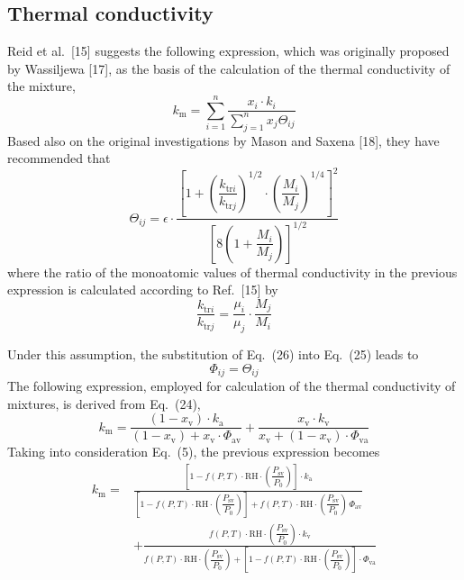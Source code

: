 \documentclass[11pt]{article}
\newcommand{\Psv}{P_\mathrm{sv}}
\newcommand{\RH}{\mathrm{RH}}
\newcommand{\fPT}{f(P,T)}
\newcommand{\grp}{\fPT\cdot\RH\cdot\left(\dfrac{\Psv}{P_0}\right)}
\begin{document}
\subsection{Thermal conductivity}

Reid et al.\ [15] suggests the following expression, which was
originally proposed by Wassiljewa [17], as the basis of the
calculation of the thermal conductivity of the mixture,
\begin{equation}
k_\mathrm{m} = \sum_{i=1}^{n}
  \frac{x_i\cdot k_i}{\sum_{j=1}^{n} x_j \Theta_{ij}}
\end{equation}
Based also on the original investigations by Mason and Saxena [18],
they have recommended that
\begin{equation}
\Theta_{ij} = \epsilon\cdot\frac{\left[1
  + \left(\dfrac{k_{\mathrm{tr}i}}{k_{\mathrm{tr}j}}\right)^{1/2}
  \cdot\left(\dfrac{M_i}{M_j}\right)^{1/4}\right]^{2}}
  {\left[8\left(1+\dfrac{M_i}{M_j}\right)\right]^{1/2}}
\end{equation}
where the ratio of the monoatomic values of thermal conductivity in the
previous expression is calculated according to Ref.~[15] by
\begin{equation}
\frac{k_{\mathrm{tr}i}}{k_{\mathrm{tr}j}}
 = \frac{\mu_i}{\mu_j}\cdot\frac{M_j}{M_i}
\end{equation}


\noindent Under this assumption, the substitution of Eq.~(26) into
Eq.~(25) leads to
\begin{equation}
\Phi_{ij} = \Theta_{ij}
\end{equation}
The following expression, employed for calculation of the thermal
conductivity of mixtures, is derived from Eq.~(24),
\begin{equation}
k_\mathrm{m} = \frac{(1-x_\mathrm{v})\cdot k_\mathrm{a}}
  {(1-x_\mathrm{v}) + x_\mathrm{v}\cdot\Phi_\mathrm{av}}
  + \frac{x_\mathrm{v}\cdot k_\mathrm{v}}
  {x_\mathrm{v} + (1-x_\mathrm{v})\cdot\Phi_\mathrm{va}}
\end{equation}
Taking into consideration Eq.~(5), the previous expression becomes
\begin{equation}
\begin{split}
k_\mathrm{m} = {} &
 \frac{\left[1-\grp\right]\cdot k_\mathrm{a}}
      {\left[1-\grp\right] + \grp\,\Phi_\mathrm{av}} \\[6pt]
 & + \frac{\grp\cdot k_\mathrm{v}}
        {\grp + \left[1-\grp\right]\cdot\Phi_\mathrm{va}}
\end{split}
\end{equation}
\end{document}
